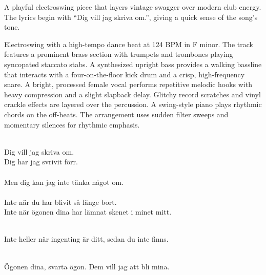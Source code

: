 

\begin{notes}
A playful electroswing piece that layers vintage swagger over modern club energy. %
The lyrics begin with “Dig vill jag skriva om.”, giving a quick sense of the song’s tone.
\end{notes}

\begin{style}
Electroswing with a high-tempo dance beat at 124 BPM in F minor. %
The track features a prominent brass section with trumpets and trombones playing syncopated staccato stabs. %
A synthesized upright bass provides a walking bassline that interacts with a four-on-the-floor kick drum and a crisp, high-frequency snare. %
A bright, processed female vocal performs repetitive melodic hooks with heavy compression and a slight slapback delay. %
Glitchy record scratches and vinyl crackle effects are layered over the percussion. %
A swing-style piano plays rhythmic chords on the off-beats. %
The arrangement uses sudden filter sweeps and momentary silences for rhythmic emphasis.
\end{style}

\begin{lyrics}

\\
Dig vill jag skriva om.\\
Dig har jag svrivit förr.\\
\\
Men dig kan jag inte tänka något om.\\
\\
Inte när du har blivit så länge bort.\\
Inte när ögonen dina har lämnat skenet i minet mitt.

\\
Inte heller när ingenting är ditt, sedan du inte finns.

\\
Ögonen dina, svarta ögon.  Dem vill jag att bli mina.

\end{lyrics}

